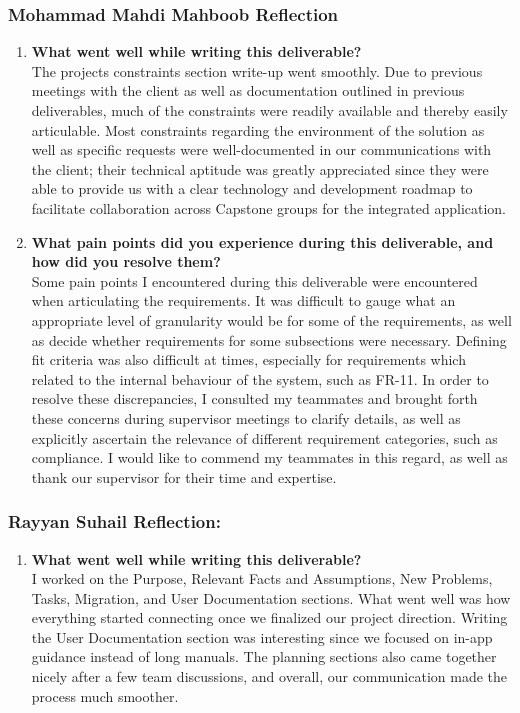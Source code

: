 \begin{enumerate}
\subsubsection*{Mohammad Mahdi Mahboob Reflection}
\begin{enumerate}
  \item \textbf{What went well while writing this deliverable?} \\
  The projects constraints section write-up went smoothly. Due to previous meetings with the client as well as
  documentation outlined in previous deliverables, much of the constraints were readily available and thereby easily
  articulable. Most constraints regarding the environment of the solution as well as specific requests were
  well-documented in our communications with the client; their technical aptitude was greatly appreciated since they
  were able to provide us with a clear technology and development roadmap to facilitate collaboration across Capstone
  groups for the integrated application.
  \item \textbf{What pain points did you experience during this deliverable, and how did you resolve them?} \\
  Some pain points I encountered during this deliverable were encountered when articulating the requirements. It was
  difficult to gauge what an appropriate level of granularity would be for some of the requirements, as well as decide
  whether requirements for some subsections were necessary. Defining fit criteria was also difficult at times,
  especially for requirements which related to the internal behaviour of the system, such as FR-11. In order to resolve
  these discrepancies, I consulted my teammates and brought forth these concerns during supervisor meetings to
  clarify details, as well as explicitly ascertain the relevance of different requirement categories, such as
  compliance. I would like to commend my teammates in this regard, as well as thank our supervisor for their time and
  expertise.
\end{enumerate}

\subsubsection*{Rayyan Suhail Reflection:}
\begin{enumerate}
  \item \textbf{What went well while writing this deliverable?} \\
  I worked on the Purpose, Relevant Facts and Assumptions, New Problems, Tasks, Migration, and User Documentation sections. What went well was how everything started connecting once we finalized our project direction. Writing the User Documentation section was interesting since we focused on in-app guidance instead of long manuals. The planning sections also came together nicely after a few team discussions, and overall, our communication made the process much smoother.


\end{enumerate}
\end{enumerate}
